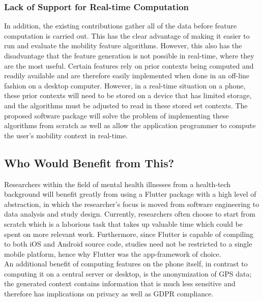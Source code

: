 \subsubsection{Lack of Support for Real-time Computation}
In addition, the existing contributions gather all of the data before feature computation is carried out. This has the clear advantage of making it easier to run and evaluate the mobility feature algorithms. However, this also has the disadvantage that the feature generation is not possible in real-time, where they are the most useful. Certain features rely on prior contexts being computed and readily available and are therefore easily implemented when done in an off-line fashion on a desktop computer. However, in a real-time situation on a phone, these prior contexts will need to be stored on a device that has limited storage, and the algorithms must be adjusted to read in these stored set contexts. The proposed software package will solve the problem of implementing these algorithms from scratch as well as allow the application programmer to compute the user's mobility context in real-time.

\subsection{Who Would Benefit from This?}
Researchers within the field of mental health illnesses from a health-tech background will benefit greatly from using a Flutter package with a high level of abstraction, in which the researcher's focus is moved from software engineering to data analysis and study design. Currently, researchers often choose to start from scratch which is a laborious task that takes up valuable time which could be spent on more relevant work. Furthermore, since Flutter is capable of compiling to both iOS and Android source code, studies need not be restricted to a single mobile platform, hence why Flutter was the app-framework of choice.\\

An additional benefit of computing features on the phone itself, in contrast to computing it on a central server or desktop, is the anonymization of GPS data; the generated context contains information that is much less sensitive and therefore has implications on privacy as well as GDPR compliance.


